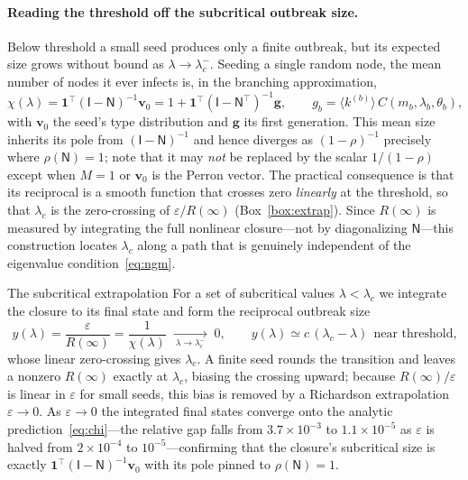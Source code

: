\documentclass[11pt]{article}
\newcounter{sbox}
\newcommand{\avg}[1]{\langle #1 \rangle}
\newcommand{\kk}[1]{k^{(#1)}}
\newcommand{\one}{\bm{1}}
\newcommand{\Nmat}{\mathsf{N}}
\newcommand{\lc}{\lambda_c}
\newcommand{\Rinf}{R(\infty)}
\begin{document}
\paragraph{Reading the threshold off the subcritical outbreak size.}
Below threshold a small seed produces only a finite outbreak, but its expected
size grows without bound as $\lambda\to\lc^-$. Seeding a single random node,
the mean number of nodes it ever infects is, in the branching approximation,
\begin{equation}
\chi(\lambda)=\one^{\!\top}(\mathsf I-\Nmat)^{-1}\bm v_0
            =1+\one^{\!\top}(\mathsf I-\Nmat^{\!\top})^{-1}\bm g,
\qquad g_b=\avg{\kk b}\,C(m_b,\lambda_b,\theta_b),
\label{eq:chi}
\end{equation}
with $\bm v_0$ the seed's type distribution and $\bm g$ its first generation.
This mean size inherits its pole from $(\mathsf I-\Nmat)^{-1}$ and hence
diverges as $(1-\rho)^{-1}$ precisely where $\rho(\Nmat)=1$; note that it may
\emph{not} be replaced by the scalar $1/(1-\rho)$ except when $M=1$ or $\bm v_0$
is the Perron vector. The practical consequence is that its reciprocal is a
smooth function that crosses zero \emph{linearly} at the threshold, so that
$\lc$ is the zero-crossing of $\varepsilon/\Rinf$ (Box~\ref{box:extrap}). Since
$\Rinf$ is measured by integrating the full nonlinear closure---not by
diagonalizing $\Nmat$---this construction locates $\lc$ along a path that is
genuinely independent of the eigenvalue condition~\eqref{eq:ngm}.

\begin{sbox}{The subcritical extrapolation}\label{box:extrap}
For a set of subcritical values $\lambda<\lc$ we integrate the closure to its
final state and form the reciprocal outbreak size
\begin{equation}
y(\lambda)=\frac{\varepsilon}{\Rinf}=\frac{1}{\chi(\lambda)}
          \;\xrightarrow[\ \lambda\to\lc^-\ ]{}\; 0 ,
\qquad y(\lambda)\simeq c\,(\lc-\lambda)\ \ \text{near threshold,}
\label{eq:y}
\end{equation}
whose linear zero-crossing gives $\lc$. A finite seed rounds the transition
and leaves a nonzero $\Rinf$ exactly at $\lc$, biasing the crossing upward;
because $\Rinf/\varepsilon$ is linear in $\varepsilon$ for small seeds, this
bias is removed by a Richardson extrapolation $\varepsilon\to0$. As
$\varepsilon\to0$ the integrated final states converge onto the analytic
prediction~\eqref{eq:chi}---the relative gap falls from $3.7\times10^{-3}$ to
$1.1\times10^{-5}$ as $\varepsilon$ is halved from $2\times10^{-4}$ to
$10^{-5}$---confirming that the closure's subcritical size is exactly
$\one^{\!\top}(\mathsf I-\Nmat)^{-1}\bm v_0$ with its pole pinned to
$\rho(\Nmat)=1$.
\end{sbox}
\end{document}
